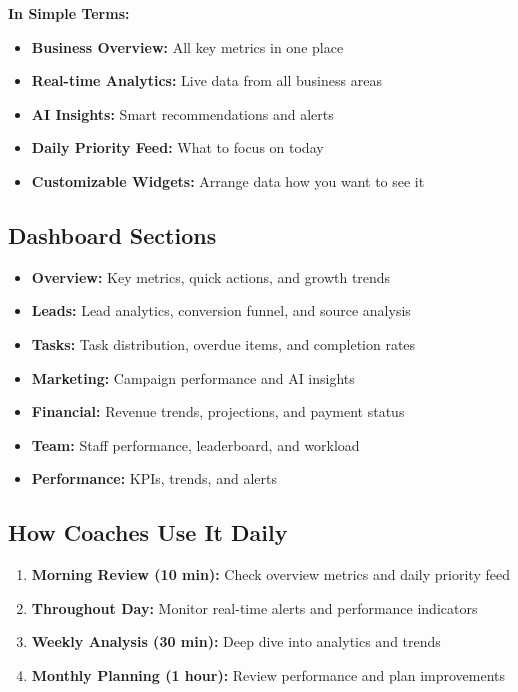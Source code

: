 \documentclass[12pt,a4paper]{article}
\begin{document}
\textbf{In Simple Terms:}
\begin{itemize}
    \item \textbf{Business Overview:} All key metrics in one place
    \item \textbf{Real-time Analytics:} Live data from all business areas
    \item \textbf{AI Insights:} Smart recommendations and alerts
    \item \textbf{Daily Priority Feed:} What to focus on today
    \item \textbf{Customizable Widgets:} Arrange data how you want to see it
\end{itemize}

\subsection{Dashboard Sections}
\begin{itemize}
    \item \textbf{Overview:} Key metrics, quick actions, and growth trends
    \item \textbf{Leads:} Lead analytics, conversion funnel, and source analysis
    \item \textbf{Tasks:} Task distribution, overdue items, and completion rates
    \item \textbf{Marketing:} Campaign performance and AI insights
    \item \textbf{Financial:} Revenue trends, projections, and payment status
    \item \textbf{Team:} Staff performance, leaderboard, and workload
    \item \textbf{Performance:} KPIs, trends, and alerts
\end{itemize}

\subsection{How Coaches Use It Daily}
\begin{enumerate}
    \item \textbf{Morning Review (10 min):} Check overview metrics and daily priority feed
    \item \textbf{Throughout Day:} Monitor real-time alerts and performance indicators
    \item \textbf{Weekly Analysis (30 min):} Deep dive into analytics and trends
    \item \textbf{Monthly Planning (1 hour):} Review performance and plan improvements
\end{enumerate}
\end{document}
